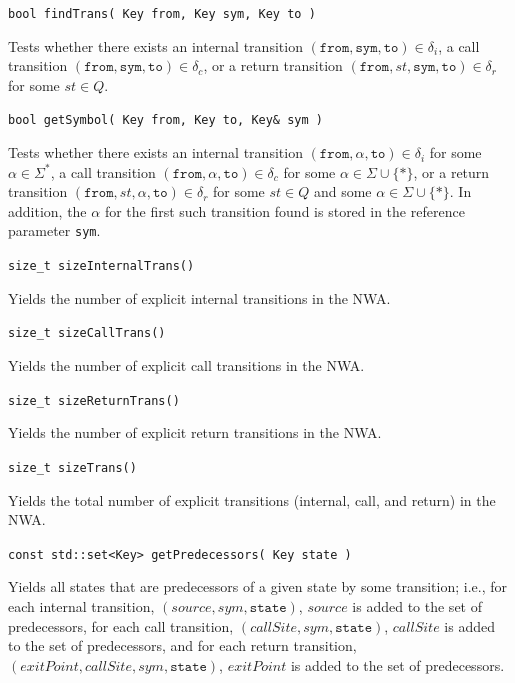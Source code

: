 \documentclass{llncs}
\begin{document}
\begin{description}

  \item\texttt{bool findTrans( Key from, Key sym, Key to )} \nopagebreak

    Tests whether there exists an internal transition $(\texttt{from},\texttt{sym},\texttt{to}) \in \delta_i$, a call transition $(\texttt{from},\texttt{sym},\texttt{to}) \in \delta_c$, or a return transition $(\texttt{from},st,\texttt{sym},\texttt{to}) \in \delta_r$ for some $st \in Q$.

  \item\texttt{bool getSymbol( Key from, Key to, Key\& sym )} \nopagebreak

    Tests whether there exists an internal transition $(\texttt{from},\alpha,\texttt{to}) \in \delta_i$ for some $\alpha \in \Sigma^*$, a call transition $(\texttt{from},\alpha,\texttt{to}) \in \delta_c$ for some $\alpha \in \Sigma \cup \{*\}$, or a return transition $(\texttt{from},st,\alpha,\texttt{to}) \in \delta_r$ for some $st \in Q$ and some $\alpha \in \Sigma \cup \{*\}$.  In addition, the $\alpha$ for the first such transition found is stored in the reference parameter \texttt{sym}.

  \item\texttt{size\_t sizeInternalTrans()} \nopagebreak

    Yields the number of explicit internal transitions in the NWA.

  \item\texttt{size\_t sizeCallTrans()} \nopagebreak

    Yields the number of explicit call transitions in the NWA.

  \item\texttt{size\_t sizeReturnTrans()} \nopagebreak

    Yields the number of explicit return transitions in the NWA.

  \item\texttt{size\_t sizeTrans()} \nopagebreak

    Yields the total number of explicit transitions (internal, call, and return) in the NWA.

  \item\texttt{const std::set<Key> getPredecessors( Key state )} \nopagebreak

    Yields all states that are predecessors of a given state by some transition; i.e., for each internal transition, $(source,sym,\texttt{state})$, $source$ is added to the set of predecessors, for each call transition, $(callSite,sym,\texttt{state})$, $callSite$ is added to the set of predecessors, and for each return transition, $(exitPoint,callSite,sym,\texttt{state})$, $exitPoint$ is added to the set of predecessors.


\end{description}
\end{document}
